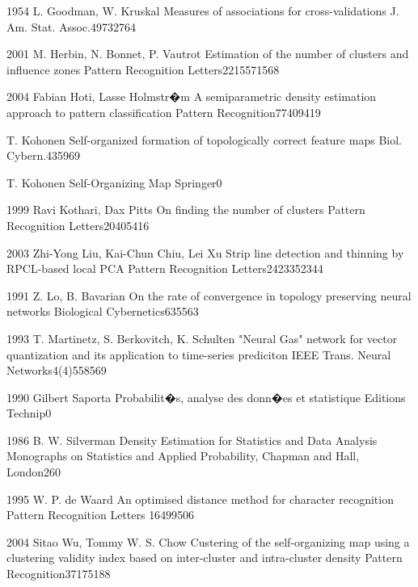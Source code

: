  {1954} {L. Goodman, W. Kruskal}
{Measures of associations for cross-validations}
{J. Am. Stat. Assoc.}{49}{732}{764}

 {2001} {M. Herbin, N. Bonnet, P. Vautrot}
{Estimation of the number of clusters and influence zones}
{Pattern Recognition Letters}{22}{1557}{1568}

 {2004} {Fabian Hoti, Lasse Holmstr�m}
{A semiparametric density estimation approach to pattern classification}
{Pattern Recognition}{77}{409}{419}

 {T. Kohonen}
{Self-organized formation of topologically correct feature maps}
{Biol. Cybern.}{43}{59}{69}

 {T. Kohonen}
{Self-Organizing Map}
{Springer}{}{0}{}

 {1999} {Ravi Kothari, Dax Pitts}
{On finding the number of clusters}
{Pattern Recognition Letters}{20}{405}{416}


 {2003} {Zhi-Yong Liu, Kai-Chun Chiu, Lei Xu}
{Strip line detection and thinning by RPCL-based local PCA}
{Pattern Recognition Letters}{24}{2335}{2344}

 {1991} {Z. Lo, B. Bavarian}
{On the rate of convergence in topology preserving neural networks}
{Biological Cybernetics}{63}{55}{63}

 {1993} {T. Martinetz, S. Berkovitch, K. Schulten}
{"Neural Gas" network for vector quantization and its application to time-series prediciton}
{IEEE Trans. Neural Networks}{4(4)}{558}{569}

 {1990} {Gilbert Saporta}
{Probabilit�s, analyse des donn�es et statistique}
{Editions Technip}{}{0}{}

 {1986} {B. W.  Silverman}
{Density Estimation for Statistics and Data Analysis}
{Monographs on Statistics and Applied Probability, Chapman and Hall, London}{26}{0}{}

 {1995} {W. P. de Waard}
{An optimised distance method for character recognition}
{Pattern Recognition Letters }{16}{499}{506}

 {2004} {Sitao Wu, Tommy W. S. Chow}
{Custering of the self-organizing map using a clustering validity index based on inter-cluster and intra-cluster density}
{Pattern Recognition}{37}{175}{188}

